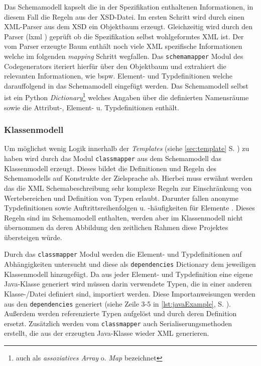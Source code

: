 Das Schemamodell kapselt die in der Spezifikation enthaltenen Informationen, in diesem Fall die Regeln aus der \gls{XSD}-Datei. Im ersten Schritt wird durch einen XML-Parser aus dem \gls{XSD} ein Objektbaum erzeugt. Gleichzeitig wird durch den Parser (lxml \cite{lxml}) geprüft ob die Spezifikation selbst wohlgeformtes \gls{XML} ist.
Der vom Parser erzeugte Baum enthält noch viele \gls{XML} spezifische Informationen welche im folgenden \emph{mapping} Schritt wegfallen. Das \texttt{schemamapper} Modul des Codegenerators iteriert hierfür über den Objektbaum und extrahiert die relevanten Informationen, wie bspw. Element- und Typdefinitionen welche darauffolgend in das Schemamodell eingefügt werden. Das Schemamodell selbst ist ein Python \emph{Dictionary}\footnote{auch als \emph{assoziatives Array} o. \emph{Map} bezeichnet} welches Angaben über die definierten Namensräume sowie die Attribut-, Element- u. Typdefinitionen enthält.

\subsubsection{Klassenmodell}
\label{sec:classmodel}

Um möglichst wenig Logik innerhalb der \emph{Templates} (siehe \cref{sec:template} S. \pageref{sec:template}) zu haben wird durch das Modul \texttt{classmapper} aus dem Schemamodell das Klassenmodell erzeugt. Dieses bildet die Definitionen und Regeln des Schemamodells auf Konstrukte der Zielsprache ab. Hierbei muss erwähnt werden das die XML Schemabeschreibung sehr komplexe Regeln zur Einschränkung von Wertebereichen und Definition von Typen erlaubt. Darunter fallen anonyme Typdefinitionen sowie Auftrittsreihenfolgen u. -häufigkeiten für Elemente \cite{XMLschema}. Dieses Regeln sind im Schemamodell enthalten, werden aber im Klassenmodell nicht übernommen da deren Abbildung den zeitlichen Rahmen diese Projektes übersteigen würde.

Durch das \texttt{classmapper} Modul werden die Element- und Typdefinitionen auf Abhängigkeiten untersucht und diese als \texttt{dependencies} Dictionary dem jeweiligen Klassenmodell hinzugefügt. Da aus jeder Element- und Typdefinition eine eigene Java-Klasse generiert wird müssen darin verwendete Typen, die in einer anderen Klasse-/Datei definiert sind, importiert werden. Diese Importanweisungen werden aus den \texttt{dependencies} generiert (siehe Zeile 3-5 in \cref{lst:javaExample}, S. \pageref{lst:javaExample}).
Außerdem werden referenzierte Typen aufgelöst und durch deren Definition ersetzt. Zusätzlich werden vom \texttt{classmapper} auch Serialiserungsmethoden erstellt, die aus der erzeugten Java-Klasse wieder \gls{XML} generieren.

